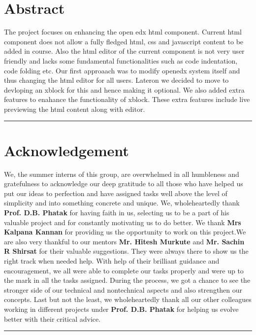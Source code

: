 \documentclass[a4paper, twosided, openany]{memoir}
\begin{document}
\chapter*{Abstract}
The project focuses on enhancing the open edx html component. Current html component does not
allow a fully fledged html, css and javascript content to be added in course. Also the html editor of
the current component is not very user friendly and lacks some fundamental functionalities such as
code indentation, code folding etc. Our first approaach was to modify openedx system itself and
thus changing the html editor for all users. Lateron we decided to move to devloping an xblock for
this and hence making it optional. We also added extra features to enahance the functionality of
xblock. These extra features include live previewing the html content along with editor.\newline
\par\fancybreak{$***$}\par

\newpage

\chapter*{Acknowledgement}
	We, the summer interns of this group, are overwhelmed in all humbleness and
gratefulness to acknowledge our deep gratitude to all those who have helped us put
our ideas to perfection and have assigned tasks well above the level of simplicity and
into something concrete and unique.
We, wholeheartedly thank \textbf{Prof. D.B. Phatak} for having faith in us, selecting us to be
a part of his valuable project and for constantly motivating us to do better.
We thank \textbf{Mrs Kalpana Kannan} for providing us the opportunity to work on this
project.We are also very thankful to our mentors \textbf{Mr. Hitesh Murkute} and \textbf{Mr. Sachin R Shirsat}
for their valuable suggestions. They were always there to show us the right track when needed help.
With help of their brilliant guidance and encouragement, we all were able to complete
our tasks properly and were up to the mark in all the tasks assigned. During the
process, we got a chance to see the stronger side of our technical and nontechnical
aspects and also strengthen our concepts.
Last but not the least, we wholeheartedly thank all our other colleagues working in
different projects under \textbf{Prof. D.B. Phatak} for helping us evolve better with their critical advice.\newline
\par\fancybreak{$***$}\par
\newpage

\tableofcontents

\mainmatter










\end{document}
